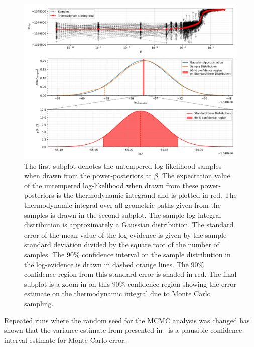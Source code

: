 \begin{figure}[th]
\centering
\includegraphics[width=1.0\textwidth]{figs/chapter6/ti_monte_carlo_error.png}
\caption{The first subplot denotes the untempered log-likelihood samples when drawn from the power-posteriors at $\beta$. The expectation value of the untempered log-likelihood when drawn from these power-posteriors is the thermodynamic integrand and is plotted in red. The thermodynamic integral over all geometric paths given from the samples is drawn in the second subplot. The sample-log-integral distribution is approximately a Gaussian distribution. The standard error of the mean value of the log evidence is given by the sample standard deviation divided by the square root of the number of samples. The $90 \%$ confidence interval on the sample distribution in the log-evidence is drawn in dashed orange lines. The $90\%$ confidence region from this standard error is shaded in red. The final subplot is a zoom-in on this $90 \%$ confidence region showing the error estimate on the thermodynamic integral due to Monte Carlo sampling.}
\label{fig:ti_monte_carlo_error}
\end{figure}

Repeated runs where the random seed for the MCMC analysis was changed has shown that the variance estimate from presented in~\cite{annis2019thermodynamic} is a plausible confidence interval estimate for Monte Carlo error.

